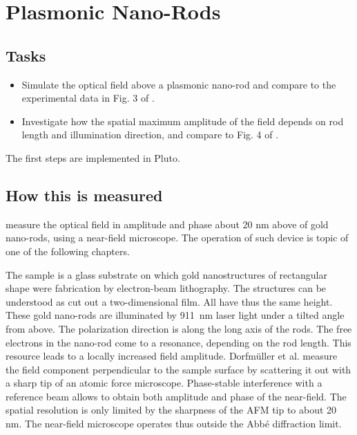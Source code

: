 \renewcommand{\lastmod}{December 9, 2021}
\renewcommand{\chapterauthors}{Markus Lippitz}


\chapter{Plasmonic Nano-Rods}

\section{Tasks}

\begin{itemize}
\item Simulate the optical field above a plasmonic nano-rod and compare to the experimental data in Fig. 3 of \cite{Dorfmueller10}.
\item Investigate how the spatial maximum amplitude of the field depends on rod length and illumination direction, and compare to Fig. 4 of  \cite{Dorfmueller10}.
\end{itemize}

The first steps are implemented in Pluto.

\section{How this is  measured}

\cite{Dorfmueller10} measure the optical field in amplitude and phase about 20 nm above of gold nano-rods, using a near-field microscope. The operation of such device is topic of one of the following chapters. 

The sample is a glass substrate on which gold nanostructures of rectangular shape were fabrication by electron-beam lithography. The structures can be understood as cut out a two-dimensional film. All have thus the same height. These gold nano-rods are illuminated by 911~nm laser light under a tilted angle from above. The polarization direction is along the long axis of the rods. The free electrons in the nano-rod come to a resonance, depending on the rod length. This resource leads to a locally increased field amplitude. Dorfmüller et al. measure the field component perpendicular to the sample surface by scattering it out with a sharp tip of an atomic force microscope. Phase-stable interference with a reference beam allows to obtain both amplitude and phase of the near-field. The spatial resolution is only limited by the sharpness of the AFM tip to about 20 nm. The near-field microscope operates thus outside the Abbé diffraction limit.


